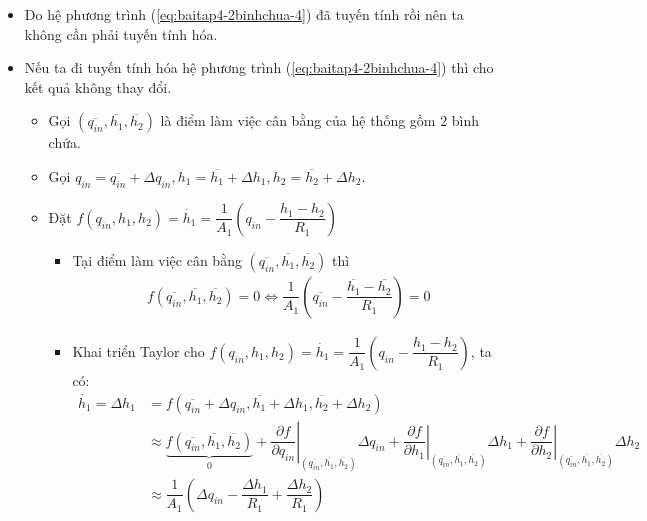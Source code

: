 \begin{enumerate}[\it a.]
\begin{itemize}
                \item Do hệ phương trình (\ref{eq:baitap4-2binhchua-4}) đã tuyến tính rồi nên ta không cần phải tuyến tính hóa.

                \item Nếu ta đi tuyến tính hóa hệ phương trình (\ref{eq:baitap4-2binhchua-4}) thì cho kết quả không thay đổi.
                    \begin{itemize}
                        \item Gọi $\left({\overline{q_{in}}, \overline{h_1}, \overline{h_2}}\right)$ là điểm làm việc cân bằng của hệ thống gồm 2 bình chứa.

                        \item Gọi $q_{in} = \overline{q_{in}} + \Delta q_{in}, h_1 = \overline{h_1} + \Delta h_1, h_2 = \overline{h_2} + \Delta h_2$.

                        \item Đặt $f\left({q_{in}, h_1, h_2}\right) = \dot{h_1} = \dfrac{1}{A_1} \left({q_{in} - \dfrac{h_1 - h_2}{R_1}}\right)$
                            \begin{itemize}
                                \item Tại điểm làm việc cân bằng $\left({\overline{q_{in}}, \overline{h_1}, \overline{h_2}}\right)$ thì
                                    \begin{align}
                                        f\left({\overline{q_{in}}, \overline{h_1}, \overline{h_2}}\right) = 0 \Longleftrightarrow \dfrac{1}{A_1} \left({\overline{q_{in}} - \dfrac{\overline{h_1} - \overline{h_2}}{R_1}}\right) = 0
                                    \end{align}

                                \item Khai triển Taylor cho $f\left({q_{in}, h_1, h_2}\right) = \dot{h_1} = \dfrac{1}{A_1} \left({q_{in} - \dfrac{h_1 - h_2}{R_1}}\right)$, ta có:
                                    \begin{align}
                                        \dot{h_1} = \Delta h_1 & = f\left({\overline{q_{in}} + \Delta q_{in}, \overline{h_1} + \Delta h_1, \overline{h_2} + \Delta h_2}\right) \\
                                        & \approx \underbrace{f\left({\overline{q_{in}}, \overline{h_1}, \overline{h_2}}\right)}_{0} + \left.\dfrac{\partial f}{\partial q_{in}}\right|_{\left({\overline{q_{in}}, \overline{h_1}, \overline{h_2}}\right)} \Delta q_{in} + \left.\dfrac{\partial f}{\partial h_1}\right|_{\left({\overline{q_{in}}, \overline{h_1}, \overline{h_2}}\right)} \Delta h_1 + \left.\dfrac{\partial f}{\partial h_2}\right|_{\left({\overline{q_{in}}, \overline{h_1}, \overline{h_2}}\right)} \Delta h_2\\
                                        & \approx \dfrac{1}{A_1} \left({\Delta q_{in} - \dfrac{\Delta h_1}{R_1} + \dfrac{\Delta h_2}{R_1}}\right)\\
                                    \end{align}


\end{itemize}
\end{itemize}
\end{itemize}
\end{enumerate}
